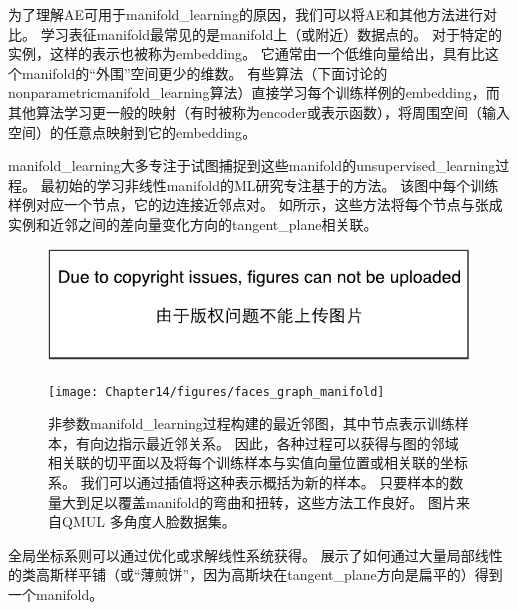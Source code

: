 
为了理解\gls{AE}可用于\gls{manifold_learning}的原因，我们可以将\gls{AE}和其他方法进行对比。
学习表征\gls{manifold}最常见的是\gls{manifold}上（或附近）数据点的。
对于特定的实例，这样的表示也被称为\gls{embedding}。
它通常由一个低维向量给出，具有比这个\gls{manifold}的``外围''空间更少的维数。
有些算法（下面讨论的\gls{nonparametric}\gls{manifold_learning}算法）直接学习每个训练样例的\gls{embedding}，而其他算法学习更一般的映射（有时被称为\gls{encoder}或表示函数），将周围空间（输入空间）的任意点映射到它的\gls{embedding}。


\gls{manifold_learning}大多专注于试图捕捉到这些\gls{manifold}的\gls{unsupervised_learning}过程。
最初始的学习非线性\gls{manifold}的\gls{ML}研究专注基于的方法。
该图中每个训练样例对应一个节点，它的边连接近邻点对。
如所示，这些方法\citep{Scholkopf98,Roweis2000-lle-small,Tenenbaum2000-isomap,Brand2003-small,Belkin+Niyogi-2003,Donoho+Carrie-03,Weinberger04a-small,SNE-nips15-small,VanDerMaaten08-small}将每个节点与张成实例和近邻之间的差向量变化方向的\gls{tangent_plane}相关联。

\begin{figure}[!htb]
\ifOpenSource
\centerline{\includegraphics{figure.pdf}}
\else
\centerline{\texttt{[image: Chapter14/figures/faces\_graph\_manifold]}}
\fi
\caption{非参数\gls{manifold_learning}过程构建的最近邻图，其中节点表示训练样本，有向边指示最近邻关系。
因此，各种过程可以获得与图的邻域相关联的切平面以及将每个训练样本与实值向量位置或相关联的坐标系。
我们可以通过插值将这种表示概括为新的样本。
只要样本的数量大到足以覆盖\gls{manifold}的弯曲和扭转，这些方法工作良好。 
图片来自QMUL 多角度人脸数据集\citep{Gong-et-al-2000}。
}
\label{fig:chap14_faces_graph_manifold}
\end{figure}

全局坐标系则可以通过优化或求解线性系统获得。
展示了如何通过大量局部线性的类高斯样平铺（或``薄煎饼''，因为高斯块在\gls{tangent_plane}方向是扁平的）得到一个\gls{manifold}。

